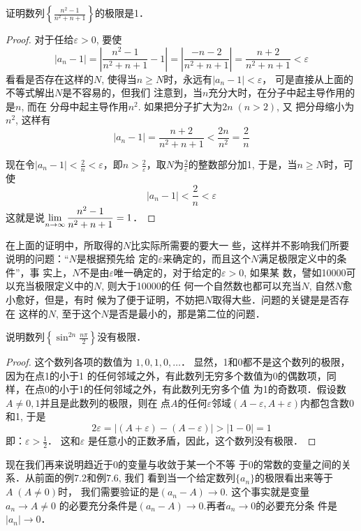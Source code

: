 \begin{example}
    证明数列$\left\{\frac{n^2-1}{n^2+n+1}\right\}$的极限是1．
\end{example}

\begin{proof}
对于任给$\varepsilon>0$, 
要使
\[|a_n-1|=\left|\frac{n^2-1}{n^2+n+1}-1\right|=\left|\frac{-n-2}{n^2+n+1}\right|=\frac{n+2}{n^2+n+1}<\varepsilon\]
看看是否存在这样的$N$, 使得当$n\ge N$时，永远有$|a_n-1|<\varepsilon$，
可是直接从上面的不等式解出$N$是不容易的，但我们
注意到，当$n$充分大时，在分子中起主导作用的是$n$, 而在
分母中起主导作用$n^2$. 如果把分子扩大为$2n\; (n>2)$, 又
把分母缩小为$n^2$, 这样有
\[|a_n-1|=\frac{n+2}{n^2+n+1}<\frac{2n}{n^2}=\frac{2}{n}\]

现在令$|a_n-1|<\frac{2}{n}<\varepsilon$，即$n>\frac{2}{\varepsilon}$，取$N$为$\frac{2}{\varepsilon}$的整数部分加1, 于是，当$n\ge N$时，可使
\[|a_n-1|<\frac{2}{n}<\varepsilon\]
这就是说$\displaystyle\lim_{n\to\infty}\dfrac{n^2-1}{n^2+n+1}=1$．
\end{proof}

在上面的证明中，所取得的$N$比实际所需要的要大一
些，这样并不影响我们所要说明的问题：“$N$是根据预先给
定的$\varepsilon$来确定的，而且这个$N$满足极限定义中的条件”，事
实上，$N$不是由$\varepsilon$唯一确定的，对于给定的$\varepsilon>0$, 如果某
数，譬如10000可以充当极限定义中的$N$, 则大于10000的任
何一个自然数也都可以充当$N$, 自然$N$愈小愈好，但是，有时
候为了便于证明，不妨把$N$取得大些．问题的关键是是否存在
这样的$N$, 至于这个$N$是否是最小的，那是第二位的问题．

\begin{example}
说明数列$\left\{\sin^{2n}\frac{n\pi}{2}\right\}$没有极限．
\end{example}

\begin{proof}
这个数列各项的数值为
$1,0,1,0,\ldots$．
显然，1和0都不是这个数列的极限，因为在点1的小于1
的任何邻域之外，有此数列无穷多个数值为0的偶数项，同
样，在点0的小于1的任何邻域之外，有此数列无穷多个值
为1的奇数项．假设数$A\ne 0,1$并且是此数列的极限，则在
点$A$的任何$\varepsilon$邻域$(A-\varepsilon ,A+\varepsilon )$内都包含数0和1, 于是
\[2\varepsilon =|(A+\varepsilon )-(A-\varepsilon )|>|1-0|=1\]
即：$\varepsilon>\frac{1}{2}$．
这和$\varepsilon$ 是任意小的正数矛盾，因此，这个数列没有极限．
\end{proof}

现在我们再来说明趋近于0的变量与收敛于某一个不等
于0的常数的变量之间的关系．从前面的例7.2和例7.6, 我们
看到当一个给定数列$\{a_n\}$的极限看出来等于$A\; (A\ne 0)$时，
我们需要验证的是$(a_n-A)\to 0$. 这个事实就是变量$a_n\to A\ne 0$
的必要充分条件是$(a_n-A)\to 0$.再者$a_n\to 0$的必要充分条
件是$|a_n|\to 0$．

